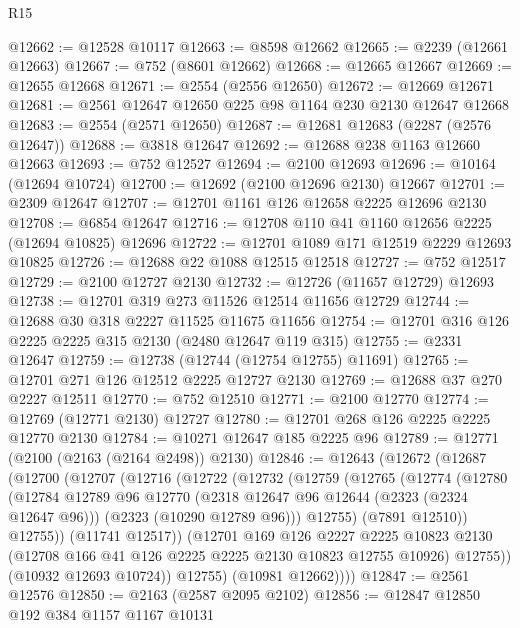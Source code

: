 \begin{lexlean}{R15}
\begin{coremodule}
@12662 := @12528 @10117
@12663 := @8598 @12662
@12665 := @2239 (@12661 @12663)
@12667 := @752 (@8601 @12662)
@12668 := @12665 @12667
@12669 := @12655 @12668
@12671 := @2554 (@2556 @12650)
@12672 := @12669 @12671
@12681 := @2561 @12647 @12650 @225 @98 @1164 @230 @2130 @12647 @12668
@12683 := @2554 (@2571 @12650)
@12687 := @12681 @12683 (@2287 (@2576 @12647))
@12688 := @3818 @12647
@12692 := @12688 @238 @1163 @12660 @12663
@12693 := @752 @12527
@12694 := @2100 @12693
@12696 := @10164 (@12694 @10724)
@12700 := @12692 (@2100 @12696 @2130) @12667
@12701 := @2309 @12647
@12707 := @12701 @1161 @126 @12658 @2225 @12696 @2130
@12708 := @6854 @12647
@12716 := @12708 @110 @41 @1160 @12656 @2225 (@12694 @10825) @12696
@12722 := @12701 @1089 @171 @12519 @2229 @12693 @10825
@12726 := @12688 @22 @1088 @12515 @12518
@12727 := @752 @12517
@12729 := @2100 @12727 @2130
@12732 := @12726 (@11657 @12729) @12693
@12738 := @12701 @319 @273 @11526 @12514 @11656 @12729
@12744 := @12688 @30 @318 @2227 @11525 @11675 @11656
@12754 := @12701 @316 @126 @2225 @2225 @315 @2130 (@2480 @12647 @119 @315)
@12755 := @2331 @12647
@12759 := @12738 (@12744 (@12754 @12755) @11691)
@12765 := @12701 @271 @126 @12512 @2225 @12727 @2130
@12769 := @12688 @37 @270 @2227 @12511
@12770 := @752 @12510
@12771 := @2100 @12770
@12774 := @12769 (@12771 @2130) @12727
@12780 := @12701 @268 @126 @2225 @2225 @12770 @2130
@12784 := @10271 @12647 @185 @2225 @96
@12789 := @12771 (@2100 (@2163 (@2164 @2498)) @2130)
@12846 := @12643
    (@12672
      (@12687
        (@12700
          (@12707
            (@12716
              (@12722
                (@12732
                  (@12759
                    (@12765
                      (@12774
                        (@12780
                          (@12784
                            @12789
                            @96
                            @12770
                            (@2318 @12647 @96 @12644 (@2323 (@2324 @12647 @96)))
                            (@2323 (@10290 @12789 @96)))
                          @12755)
                        (@7891 @12510))
                      @12755))
                  (@11741 @12517))
                (@12701
                  @169
                  @126
                  @2227
                  @2225
                  @10823
                  @2130
                  (@12708 @166 @41 @126 @2225 @2225 @2130 @10823 @12755 @10926)
                  @12755))
              (@10932 @12693 @10724))
            @12755)
          (@10981 @12662))))
@12847 := @2561 @12576
@12850 := @2163 (@2587 @2095 @2102)
@12856 := @12847 @12850 @192 @384 @1157 @1167 @10131

\end{coremodule}
\end{lexlean}
